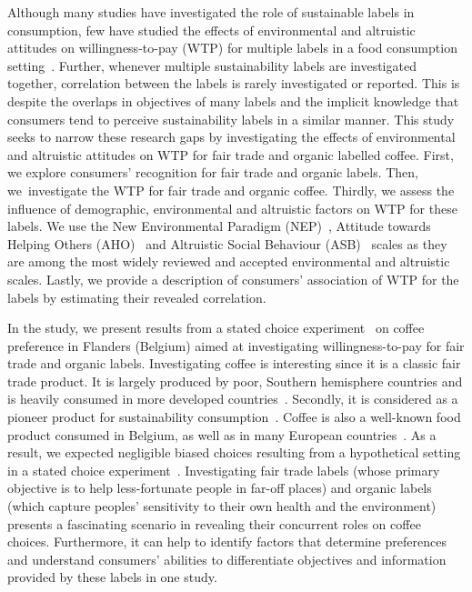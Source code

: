 \documentclass[sustainability,article,accept,moreauthors,pdftex,10pt,a4paper]{Definitions/mdpi}
\theoremstyle{mdpi}
\newcounter{ex}
\newcounter{re}
\theoremstyle{mdpidefinition}
\begin{document}
\par{Although many studies have investigated the role of sustainable labels in consumption, few have studied the effects of environmental and altruistic attitudes on willingness-to-pay (WTP) %
for multiple labels in a food consumption setting~\cite{Lusk2007,Umberger2009,Langen2011,keiko2017,Lucas2018}. Further, whenever multiple sustainability labels are investigated together, correlation between the labels is rarely investigated or reported. This is despite the overlaps in objectives of many labels and the implicit knowledge that consumers tend to perceive sustainability labels in a similar manner. This study seeks to narrow these research gaps by investigating the effects of environmental and altruistic attitudes on WTP for fair trade and organic labelled coffee. First, we explore consumers' recognition for fair trade and organic labels. Then, we~investigate the WTP for fair trade and organic coffee. Thirdly, we assess the influence of demographic, environmental and altruistic factors on WTP for these labels. We use the New Environmental Paradigm (NEP)~\cite{Dunlap2000}, Attitude towards Helping Others (AHO)~\cite{Webb2000} and Altruistic Social Behaviour (ASB)~\cite{carlo2002, carlo2003, rodrigues2017measuring} scales as they are among the most widely reviewed and accepted environmental and altruistic scales.  Lastly, we provide a description of consumers' association of WTP for the labels by estimating their revealed correlation.}
\par{In the study, we present results from a stated choice experiment~\cite{Train2009} on coffee preference in Flanders (Belgium) aimed at investigating willingness-to-pay for fair trade and organic labels. Investigating coffee is interesting since it is a classic fair trade product. It is largely  produced by poor, Southern hemisphere countries and is heavily consumed in more developed countries~\cite{Pay2009}. Secondly, it is considered as a pioneer product for sustainability consumption~\cite{Reinecke2012}. Coffee is also a well-known food product consumed in Belgium, as well as in many European countries~\cite{DePelsmacker2005,Pay2009,Reinecke2012}. As a result, we expected negligible biased choices resulting from a hypothetical setting in a stated choice experiment~\cite{neill1994hypothetical,List2001, Loomis2014}. Investigating fair trade labels (whose primary objective is to help less-fortunate people in far-off places) and organic labels (which capture peoples' sensitivity to their own health  and the environment) presents a fascinating scenario in revealing their concurrent roles on coffee choices. Furthermore, it can help to identify factors that determine preferences and understand consumers' abilities to differentiate objectives and information provided by these labels in one study.}
\end{document}
